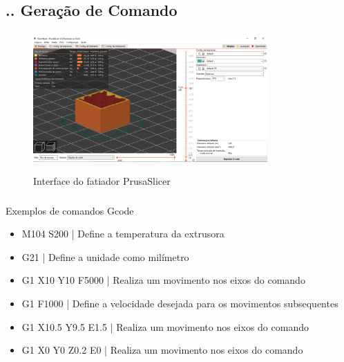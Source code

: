 \documentclass[aspectratio=169]{beamer}
\begin{document}
\subsection{\insertsectionnumber .\insertsubsectionnumber . Geração de Comando}
\begin{frame}
  \frametitle{\insertsubsection}
  \begin{figure}[H]
    \centering
    \caption{Interface do fatiador PrusaSlicer}
    \includegraphics[width=0.8\textwidth]{slicer_inter}
    \label{fig:slicer_inter}
  \end{figure}
\end{frame}

\begin{frame}
  \frametitle{\insertsubsection}
  Exemplos de comandos Gcode
  \begin{itemize}
    \item M104 S200           | Define a temperatura da extrusora
    \item G21                 | Define a unidade como milímetro
    \item G1 X10 Y10 F5000    | Realiza um movimento nos eixos do comando
    \item G1 F1000            | Define a velocidade desejada para os movimentos subsequentes
    \item G1 X10.5 Y9.5 E1.5  | Realiza um movimento nos eixos do comando
    \item G1 X0 Y0 Z0.2 E0    | Realiza um movimento nos eixos do comando 
  \end{itemize}
\end{frame}
\end{document}
